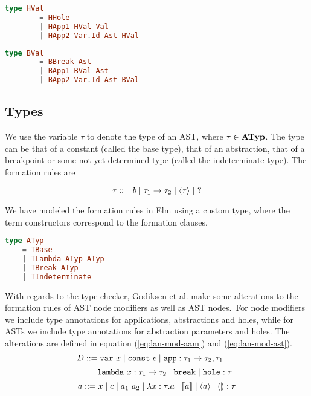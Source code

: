 \begin{lstlisting}[language=elm,%
                     label={HVal-formation},%
                     gobble=6,%
                     caption={Formation rules (\ref{hval-formation-rules}) modeled in Elm},%
                     ]
      type HVal
        = HHole
        | HApp1 HVal Val
        | HApp2 Var.Id Ast HVal
\end{lstlisting}

\begin{lstlisting}[language=elm,%
                     label={BVal-formation},%
                     gobble=6,%
                     caption={Formation rules (\ref{bval-formation-rules}) modeled in Elm},%
                     ]
      type BVal
        = BBreak Ast
        | BApp1 BVal Ast
        | BApp2 Var.Id Ast BVal
\end{lstlisting}

\subsection{Types}

We use the variable $\tau$ to denote the type of an AST, where $\tau \in \textbf{ATyp}$.
The type can be that of a constant (called the base type), that of an
abstraction, that of a breakpoint or some not yet determined type (called the
indeterminate type). The formation rules are

\begin{equation}\label{eq:atyp-formation}
    \tau ::= b \mid \tau_1 \to \tau_2 \mid \langle \tau \rangle \mid ~?
\end{equation}

We have modeled the formation rules in Elm using a custom type, where
the term constructors correspond to the formation clauses.

\begin{lstlisting}[language=elm,%
                   gobble=0,%
                   caption={Formation rules (\ref{eq:atyp-formation}) modeled in Elm},%
                   ]
type ATyp
    = TBase
    | TLambda ATyp ATyp
    | TBreak ATyp
    | TIndeterminate
\end{lstlisting}

With regards to the type checker, Godiksen et al. make some alterations to the
formation rules of AST node modifiers as well as AST nodes.\pepm~For node
modifiers we include type annotations for applications, abstractions and holes,
while for ASTs we include type annotations for abstraction parameters and
holes. The alterations are defined in equation (\ref{eq:lan-mod-aam}) and
(\ref{eq:lan-mod-ast}).
\begin{equation}\label{eq:lan-mod-aam}
  D ::= \texttt{var}~x
  \mid \texttt{const}~c
  \mid \texttt{app} : \tau_1\to\tau_2,\tau_1~~~~~
\end{equation}
\begin{equation*}~~~~
  \mid \texttt{lambda}~x : \tau_1\to\tau_2
  \mid \texttt{break}
  \mid \texttt{hole} : \tau
\end{equation*}
\begin{equation}\label{eq:lan-mod-ast}
  a ::= x
  \mid c
  \mid a_1~a_2
  \mid \lambda x : \tau.a
  \mid \llbracket a \rrbracket
  \mid \langle a \rangle
  \mid \llparenthesis\rrparenthesis : \tau
\end{equation}

